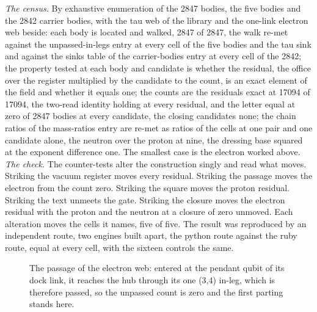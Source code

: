 \begin{chproof}
\textit{The census.} By exhaustive enumeration of the 2847 bodies, the five bodies and the 2842 carrier bodies, with the tau web of the library and the one-link electron web beside: each body is located and walked, 2847 of 2847, the walk re-met against the unpassed-in-legs entry at every cell of the five bodies and the tau sink and against the sinks table of the carrier-bodies entry at every cell of the 2842; the property tested at each body and candidate is whether the residual, the office over the register multiplied by the candidate to the count, is an exact element of the field and whether it equals one; the counts are the residuals exact at 17094 of 17094, the two-read identity holding at every residual, and the letter equal at zero of 2847 bodies at every candidate, the closing candidates none; the chain ratios of the mass-ratios entry are re-met as ratios of the cells at one pair and one candidate alone, the neutron over the proton at nine, the dressing base squared at the exponent difference one. The smallest case is the electron worked above.
\textit{The check.} The counter-tests alter the construction singly and read what moves. Striking the vacuum register moves every residual. Striking the passage moves the electron from the count zero. Striking the square moves the proton residual. Striking the text unmeets the gate. Striking the closure moves the electron residual with the proton and the neutron at a closure of zero unmoved. Each alteration moves the cells it names, five of five. The result was reproduced by an independent route, two engines built apart, the python route against the ruby route, equal at every cell, with the sixteen controls the same.
\begin{figure}[h]\centering{}\caption{The passage of the electron web: entered at the pendant qubit of its dock link, it reaches the hub through its one (3,4) in-leg, which is therefore passed, so the unpassed count is zero and the first parting stands here.}\end{figure}
\end{chproof}
